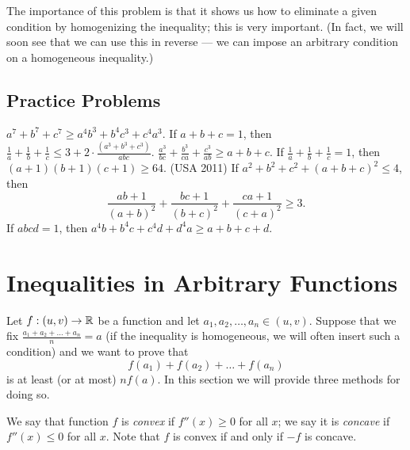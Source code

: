 \documentclass[11pt]{scrartcl}
\begin{document}
The importance of this problem is that it shows us how to eliminate a given condition
by homogenizing the inequality; this is very important.
(In fact, we will soon see that we can use this in reverse ---
we can impose an arbitrary condition on a homogeneous inequality.)

\subsection{Practice Problems}
\begin{enumerate}
  \ii $a^7+b^7+c^7 \ge a^4b^3+b^4c^3+c^4a^3$.
  \ii If $a+b+c=1$, then $\frac1a + \frac 1b + \frac 1c \le 3 + 2 \cdot \frac{(a^3+b^3+c^3)}{abc}$.
  \ii $\frac{a^3}{bc} + \frac{b^3}{ca} + \frac{c^3}{ab} \ge a+b+c$.
  \ii If $\frac1a + \frac1b + \frac 1c =1$, then $(a+1)(b+1)(c+1) \ge 64$.
  \ii (USA 2011) If $a^2+b^2+c^2+(a+b+c)^2 \le 4$, then
  \[ \frac{ab+1}{(a+b)^2} + \frac{bc+1}{(b+c)^2} + \frac{ca+1}{(c+a)^2} \ge 3. \]
  \ii If $abcd=1$, then $a^4b+b^4c+c^4d+d^4a \ge a+b+c+d$.
\end{enumerate}

\section{Inequalities in Arbitrary Functions}
Let $f : (u,v) \to \mathbb R$ be a function and let $a_1, a_2, \dots, a_n \in (u,v)$.
Suppose that we fix $\frac{a_1+a_2 + \dots + a_n}{n} = a$
(if the inequality is homogeneous, we will often insert such a condition)
and we want to prove that
\[ f(a_1) + f(a_2) + \dots + f(a_n) \]
is at least (or at most) $nf(a)$.
In this section we will provide three methods for doing so.

We say that function $f$ is \emph{convex} if $f''(x) \ge 0$ for all $x$;
we say it is \emph{concave} if $f''(x) \le 0$ for all $x$.
Note that $f$ is convex if and only if $-f$ is concave.
\end{document}
